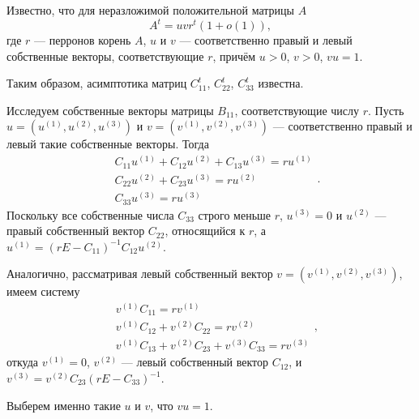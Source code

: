 \documentclass[11pt]{article}
\begin{document}
Известно, что для неразложимой положительной матрицы $A$
\begin{equation}
    A^t = u v r^t (1 + o(1)),
\end{equation}
где $r$ --- перронов корень $A$, $u$ и $v$ --- соответственно правый и левый собственные векторы, соответствующие $r$, причём $u > 0$, $v > 0$, $vu = 1$.

Таким образом, асимптотика матриц $C_{11}^t$, $C_{22}^t$, $C_{33}^t$ известна.

Исследуем собственные векторы матрицы $B_{11}$, соответствующие числу $r$. Пусть $u = (u^{(1)}, u^{(2)}, u^{(3)})$ и $v = (v^{(1)}, v^{(2)}, v^{(3)})$ --- соответственно правый и левый такие собственные векторы. Тогда
\begin{equation}
    \begin{split}
        &C_{11} u^{(1)} + C_{12} u^{(2)} + C_{13} u^{(3)} = r u^{(1)} \\
        &C_{22} u^{(2)} + C_{23} u^{(3)} = r u^{(2)} \\
        &C_{33} u^{(3)} = r u^{(3)}
    \end{split}.
\end{equation}
Поскольку все собственные числа $C_{33}$ строго меньше $r$, $u^{(3)} = 0$ и $u^{(2)}$ --- правый собственный вектор $C_{22}$, относящийся к $r$, а $u^{(1)} = (rE - C_{11})^{-1} C_{12} u^{(2)}$.

Аналогично, рассматривая левый собственный вектор $v = (v^{(1)}, v^{(2)}, v^{(3)})$, имеем систему
\begin{equation}
    \begin{split}
        &v^{(1)} C_{11} = r v^{(1)} \\
        &v^{(1)} C_{12} + v^{(2)} C_{22} = r v^{(2)} \\
        &v^{(1)} C_{13} + v^{(2)} C_{23} + v^{(3)} C_{33} = r v^{(3)}
    \end{split},
\end{equation}
откуда $v^{(1)} = 0$, $v^{(2)}$ --- левый собственный вектор $C_{12}$, и $v^{(3)} = v^{(2)} C_{23} (rE - C_{33})^{-1}$.

Выберем именно такие $u$ и $v$, что $vu = 1$.
\end{document}
